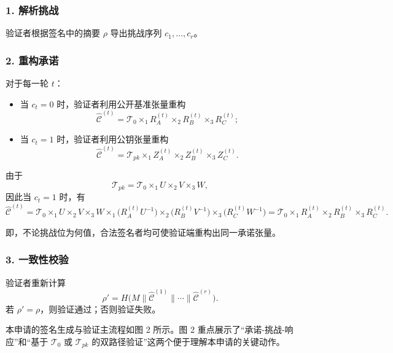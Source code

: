 \documentclass[12pt,a4paper]{article}
\begin{document}
\subsubsection{1. 解析挑战}

验证者根据签名中的摘要 $\rho$ 导出挑战序列 $c_1,\dots,c_r$。

\subsubsection{2. 重构承诺}

对于每一轮 $t$：

\begin{itemize}
    \item 当 $c_t=0$ 时，验证者利用公开基准张量重构
    \[
    \widehat{\mathcal{C}}^{(t)}=\mathcal{T}_0 \times_1 R_A^{(t)} \times_2 R_B^{(t)} \times_3 R_C^{(t)};
    \]
    \item 当 $c_t=1$ 时，验证者利用公钥张量重构
    \[
    \widehat{\mathcal{C}}^{(t)}=\mathcal{T}_{pk} \times_1 Z_A^{(t)} \times_2 Z_B^{(t)} \times_3 Z_C^{(t)}.
    \]
\end{itemize}

由于
\[
\mathcal{T}_{pk}=\mathcal{T}_0 \times_1 U \times_2 V \times_3 W,
\]
因此当 $c_t=1$ 时，有
\[
\widehat{\mathcal{C}}^{(t)}
=\mathcal{T}_0 \times_1 U \times_2 V \times_3 W
\times_1 \big(R_A^{(t)}U^{-1}\big)
\times_2 \big(R_B^{(t)}V^{-1}\big)
\times_3 \big(R_C^{(t)}W^{-1}\big)
=\mathcal{T}_0 \times_1 R_A^{(t)} \times_2 R_B^{(t)} \times_3 R_C^{(t)}.
\]

即，不论挑战位为何值，合法签名者均可使验证端重构出同一承诺张量。

\subsubsection{3. 一致性校验}

验证者重新计算
\[
\rho' = H\big(M \parallel \widehat{\mathcal{C}}^{(1)} \parallel \cdots \parallel \widehat{\mathcal{C}}^{(r)}\big).
\]
若 $\rho'=\rho$，则验证通过；否则验证失败。

本申请的签名生成与验证主流程如图 2 所示。图 2 重点展示了“承诺-挑战-响应”和“基于 $\mathcal{T}_0$ 或 $\mathcal{T}_{pk}$ 的双路径验证”这两个便于理解本申请的关键动作。
\end{document}
